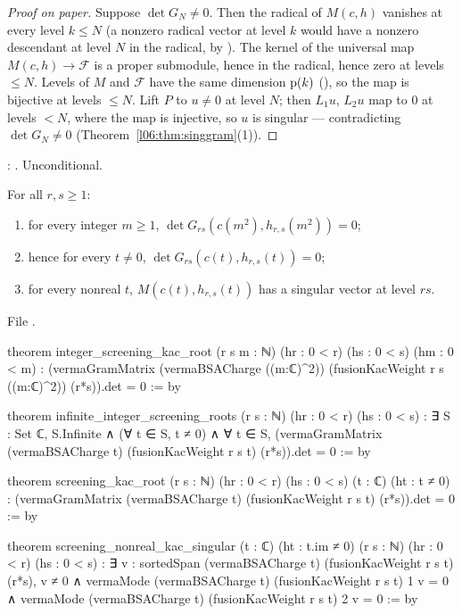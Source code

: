 \begin{proof}[Proof on paper]
Suppose $\det G_N\ne0$. Then the radical of $M(c,h)$ vanishes at every level $k\le N$ (a nonzero radical
vector at level $k$ would have a nonzero descendant at level $N$ in the radical, by
\allowbreak{}\allowbreak{}\allowbreak{}). The kernel of the universal map $M(c,h)\to\mathcal F$ is a proper submodule,
hence in the radical, hence zero at levels $\le N$. Levels of $M$ and $\mathcal F$ have the same dimension
$\mathrm{p}(k)$ (\allowbreak{}\allowbreak{}\allowbreak{}), so the map is bijective at levels $\le N$. Lift $P$ to
$u\ne0$ at level $N$; then $L_1u$, $L_2u$ map to $0$ at levels $<N$, where the map is injective, so $u$ is
singular --- contradicting $\det G_N\ne0$ (Theorem~\ref{l06:thm:singgram}(1)).
\end{proof}

\begin{status}
\allowbreak{}\allowbreak{}\allowbreak{}\allowbreak{}\allowbreak{}: \lean{[propext, Classical.}\allowbreak{}\allowbreak\lean{sound]}.
Unconditional.
\end{status}

\begin{theorem}\label{l06:thm:screenkac}
For all $r,s\ge1$:
\begin{enumerate}
\item for every integer $m\ge1$, $\det G_{rs}(c(m^2),h_{r,s}(m^2)) = 0$;
\item hence for every $t\ne0$, $\det G_{rs}(c(t),h_{r,s}(t)) = 0$;
\item for every nonreal $t$, $M(c(t),h_{r,s}(t))$ has a singular vector at level $rs$.
\end{enumerate}
\end{theorem}

File .
\begin{leancode}
theorem integer_screening_kac_root (r s m : ℕ) (hr : 0 < r) (hs : 0 < s)
    (hm : 0 < m) :
    (vermaGramMatrix (vermaBSACharge ((m:ℂ)^2))
      (fusionKacWeight r s ((m:ℂ)^2)) (r*s)).det = 0 := by

theorem infinite_integer_screening_roots (r s : ℕ) (hr : 0 < r) (hs : 0 < s) :
    ∃ S : Set ℂ, S.Infinite ∧ (∀ t ∈ S, t ≠ 0) ∧
      ∀ t ∈ S, (vermaGramMatrix (vermaBSACharge t)
        (fusionKacWeight r s t) (r*s)).det = 0 := by

theorem screening_kac_root (r s : ℕ) (hr : 0 < r) (hs : 0 < s)
    (t : ℂ) (ht : t ≠ 0) :
    (vermaGramMatrix (vermaBSACharge t) (fusionKacWeight r s t) (r*s)).det = 0 := by

theorem screening_nonreal_kac_singular (t : ℂ) (ht : t.im ≠ 0)
    (r s : ℕ) (hr : 0 < r) (hs : 0 < s) :
    ∃ v : sortedSpan (vermaBSACharge t) (fusionKacWeight r s t) (r*s),
      v ≠ 0 ∧ vermaMode (vermaBSACharge t) (fusionKacWeight r s t) 1 v = 0 ∧
        vermaMode (vermaBSACharge t) (fusionKacWeight r s t) 2 v = 0 := by
\end{leancode}

